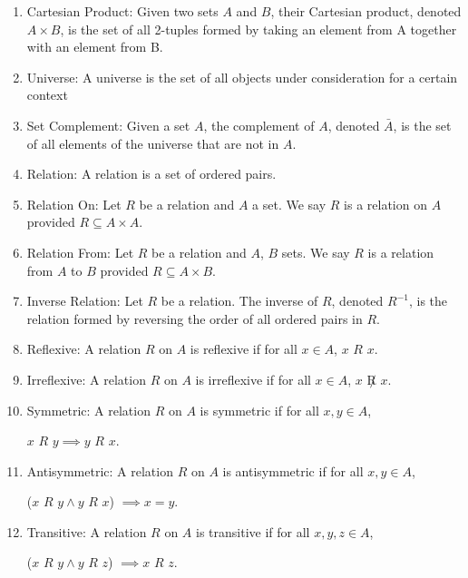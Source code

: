 \documentclass{article}
\begin{document}
\begin{enumerate}
    \item Cartesian Product: Given two sets $A$ and $B$, their Cartesian product, denoted $A\times B$, is the set of all 2-tuples formed by taking an element from A together with an element from B.

    \item Universe: A universe is the set of all objects under consideration for a certain context

    \item Set Complement: Given a set $A$, the complement of $A$, denoted $\bar A$, is the set of all elements of the universe that are not in $A$.

    \item Relation: A relation is a set of ordered pairs.

    \item Relation On: Let $R$ be a relation and $A$ a set.
    We say $R$ is a relation on $A$ provided $R\subseteq A\times A$.

    \item Relation From: Let $R$ be a relation and $A$, $B$ sets.
    We say $R$ is a relation from $A$ to $B$ provided $R\subseteq A\times B$.

    \item Inverse Relation: Let $R$ be a relation.
    The inverse of $R$, denoted $R^{-1}$, is the relation formed by reversing the order of all ordered pairs in $R$.

    \item Reflexive: A relation $R$ on $A$ is reflexive if for all $x\in A$, $x$ $R$ $x$.

    \item Irreflexive: A relation $R$ on $A$ is irreflexive if for all $x\in A$, $x$ $\not R$ $x$.

    \item Symmetric: A relation $R$ on $A$ is symmetric if for all $x,y\in A$,

    $x$ $R$ $y\implies y$ $R$ $x$.

    \item Antisymmetric: A relation $R$ on $A$ is antisymmetric if for all $x,y\in A$,

    ($x$ $R$ $y\wedge y$ $R$ $x$) $\implies x=y$.

    \item Transitive:  A relation $R$ on $A$ is transitive if for all $x,y,z\in A$,

    ($x$ $R$ $y\wedge y$ $R$ $z$) $\implies x$ $R$ $z$.


\end{enumerate}
\end{document}
